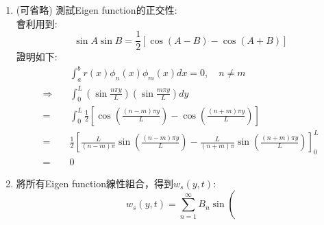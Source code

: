 \documentclass[../main.tex]{subfiles}
\begin{document}
\begin{itemize}
\begin{enumerate}
      \begin{equation}
        w_s(0,t) = \left[
          A \cos(0) + B \sin(0)
        \right] C_2 e^{-\lambda^2 \nu t} = 0
      \end{equation}
      故$A=0$
      \begin{equation}
        w_s(y,t) = B \sin(\lambda y) C_2 e^{-\lambda^2 \nu t}
      \end{equation}
      代入邊界條件(\ref{eq:ch2_4_startup_boundary_condition_2}):
      \begin{equation}
        w_s(L,t) = B \sin(\lambda L) C_2 e^{-\lambda^2 \nu t} = 0
      \end{equation}
      故$\sin(\lambda L) = 0$，解得:
      \begin{equation}
        \lambda_n = \frac{n\pi}{L}, \quad n \in \mathbb{N}
      \end{equation}
      於是拿到一系列的Eigen value，使得
      \begin{equation}
        \phi_n(y,n) = \sin\left(
          \frac{n\pi}{L} y
        \right)
      \end{equation}
    \item (可省略) 測試Eigen function的正交性:\\
    會利用到:
    \begin{equation}
      \sin A \sin B = \frac{1}{2}\left[
        \cos(A-B) - \cos (A+B)
      \right]
    \end{equation}
    證明如下:
    \begin{align}
      &\int_a^b r(x)\phi_n(x)\phi_m(x) dx = 0, \quad n \neq m \nonumber\\
     \Rightarrow \quad &\int_0^L \left(
        \sin \frac{n\pi y}{L} 
      \right)\left(
        \sin \frac{m\pi y}{L}
      \right)dy  \nonumber\\
      =& \int_0^L \frac{1}{2}\left[
        \cos \left(
          \frac{(n-m)\pi y}{L}
        \right) - \cos \left(
          \frac{(n+m)\pi y}{L}
        \right)
      \right] \nonumber\\
      =& \frac{1}{2} \left[
        \frac{L}{(n-m)\pi} \sin\left(
          \frac{(n-m)\pi y}{L}
        \right) - \frac{L}{(n+m)\pi} \sin\left(
          \frac{(n+m)\pi y}{L}
        \right)
      \right]_0^L \nonumber\\
      =& 0
    \end{align}
    \item 將所有Eigen function線性組合，得到$w_s(y,t)$:
      \begin{equation}
        w_s(y,t) = \sum_{n=1}^{\infty} B_n \sin\left(

\end{equation}
\end{enumerate}
\end{itemize}
\end{document}
